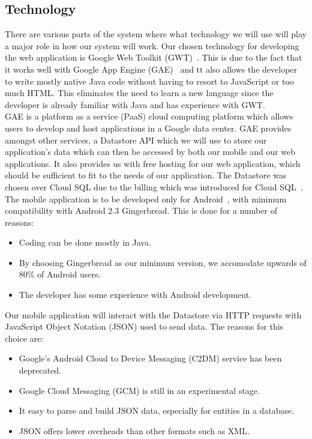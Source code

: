 \subsection{Technology}

There are various parts of the system where what technology we will use will play a major role in how our system will work. Our chosen technology for developing the web application is Google Web Toolkit (GWT)~\cite{gwt}. This is due to the fact that it works well with Google App Engine (GAE)~\cite{gae} and tt also allows the developer to write mostly native Java code without having to resort to JavaScript or too much HTML. This eliminates the need to learn a new language since the developer is already familiar with Java and has experience with GWT. \\
GAE is a platform as a service (PaaS) cloud computing platform which allows users to develop and host applications in a Google data center. GAE provides amongst other services, a Datastore API which we will use to store our application's data which can then be accessed by both our mobile and our web applications. It also provides us with free hosting for our web application, which should be sufficient to fit to the needs of our application. The Datastore was chosen over Cloud SQL due to the billing which was introduced for Cloud SQL~\cite{cloud}. \\
The mobile application is to be developed only for Android~\cite{android}, with minimum compatibility with Android 2.3 Gingerbread. This is done for a number of reasons:
\begin{itemize}
  \item Coding can be done mostly in Java.
  \item By choosing Gingerbread as our minimum version, we accomodate upwards of 80\% of Android users.
  \item The developer has some experience with Android development.
\end{itemize}
Our mobile application will interact with the Datastore via HTTP requests with JavaScript Object Notation (JSON) used to send data. The reasons for this choice are:
\begin{itemize}
  \item Google's Android Cloud to Device Messaging (C2DM) service has been deprecated.
  \item Google Cloud Messaging (GCM) is still in an experimental stage.
  \item It easy to parse and build JSON data, especially for entities in a database.
  \item JSON offers lower overheads than other formats such as XML.
\end{itemize}
